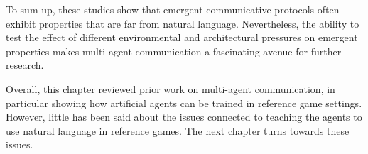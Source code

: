 To sum up, these studies show that emergent communicative protocols often exhibit properties that are far from natural language. Nevertheless, the ability to test the effect of different environmental and architectural pressures on emergent properties makes multi-agent communication a fascinating avenue for further research. 



Overall, this chapter reviewed prior work on multi-agent communication, in particular showing how artificial agents can be trained in reference game settings. However, little has been said about the issues connected to teaching the agents to use natural language in reference games. The next chapter turns towards these issues.